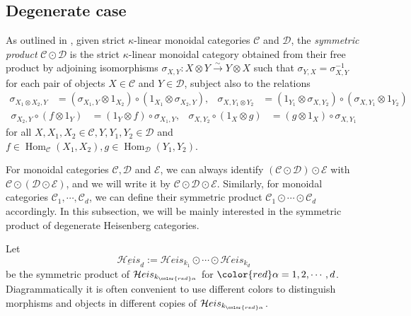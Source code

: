 \documentclass[12pt]{amsart}
\numberwithin{itemcounter}{subsection}
\theoremstyle{plain}
\theoremstyle{definition}
\theoremstyle{remark}
\numberwithin{equation}{section}
\def\kk{\kappa}
\def\Hom{\operatorname{Hom}\nolimits}
\def\Heis{\mathcal{H}eis}
\def\Heis{\mathcal{H}eis}
\def\symHeis{\underline{\mathcal{H}eis}}
\def\Hom{\operatorname{Hom}}
\def\red#1{{\color{red} #1}}
\begin{document}
    \subsection{Degenerate case}
	As outlined in \cite{BSW20b,BSW23}, given strict $\kk$-linear monoidal categories $\mathcal{C}$ and $\mathcal{D}$,
   the {\em symmetric product} $\mathcal C \odot \mathcal D$ is the strict  $\kk$-linear monoidal
	category obtained from their free product by
	adjoining isomorphisms $\sigma_{X,Y}:X \otimes Y \stackrel{\sim}{\rightarrow} Y \otimes
	X$
	such that $\sigma_{Y,X} = \sigma_{X,Y}^{-1}$
	for each pair of objects $X \in \mathcal C$ and $Y \in \mathcal D$,
	subject also to the relations
	\begin{align}\label{symm1}
		\sigma_{X_1 \otimes X_2, Y} &= (\sigma_{X_1,Y} \otimes 1_{X_2}) \circ
		(1_{X_1} \otimes \sigma_{X_2,Y}),&
		\sigma_{X, Y_1 \otimes Y_2} &= (1_{Y_1} \otimes \sigma_{X,Y_2}) \circ
		(\sigma_{X, Y_1} \otimes 1_{Y_2})
	\end{align}
	\begin{align}\label{symm2}
		\sigma_{X_2,Y} \circ (f \otimes 1_Y)  &= (1_Y \otimes f) \circ
		\sigma_{X_1,Y},&
		\sigma_{X,Y_2} \circ (1_X \otimes g) &= (g \otimes 1_X)\circ \sigma_{X,Y_1}
	\end{align}
	for all $X, X_1,X_2 \in\mathcal C, Y, Y_1,Y_2 \in \mathcal D$ and
	$f\in \Hom_{\mathcal C}(X_1,X_2), g \in \Hom_{\mathcal
		D}(Y_1,Y_2)$.

	\smallskip

	For monoidal categories $\mathcal C , \mathcal D$ and $  \mathcal E$, we can always identify $(\mathcal C \odot \mathcal D) \odot \mathcal E$ with $\mathcal C \odot (\mathcal D \odot \mathcal E)$, and we will write it by $\mathcal C \odot \mathcal D \odot \mathcal E.$ Similarly, for monoidal categories $\mathcal C_1 ,\cdots, \mathcal C_d$, we can define  their symmetric product $\mathcal C_1\odot\cdots\odot \mathcal C_d$ accordingly. In this subsection, we will be mainly interested in the symmetric product of degenerate Heisenberg categories.

	Let $$\symHeis_d:=\Heis_{k_1}\odot\cdots \odot \Heis_{k_d}$$ be the symmetric product
	of $\Heis_{k_{\red{\alpha}}}$ for ${\red{\alpha}}=1,2,\cdots, d$.  Diagrammatically it is often convenient to use different colors to distinguish morphisms and objects in different copies of $\Heis_{k_{\red{\alpha}}}$.
\end{document}
